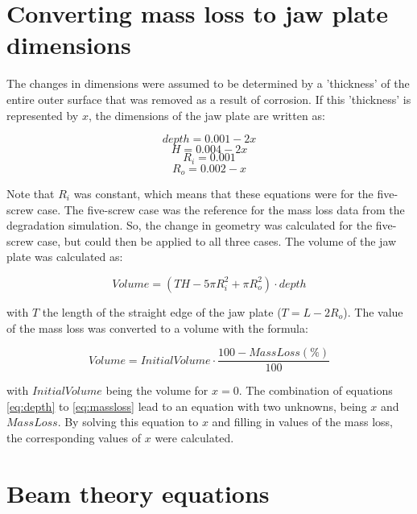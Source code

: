 \begin{subappendices}

\section{Converting mass loss to jaw plate dimensions}
\label{sec:jawplatedimensions}

The changes in dimensions were assumed to be determined by a 'thickness' of the entire outer surface that was removed as a result of corrosion. If this 'thickness' is represented by $x$, the dimensions of the jaw plate are written as:

\begin{equation}
depth=0.001-2x
\label{eq:depth}
\end{equation}
\begin{equation}
H=0.004-2x
\end{equation}
\begin{equation}
R_i=0.001
\end{equation}
\begin{equation}
R_o=0.002-x
\end{equation}

\noindent Note that $R_i$ was constant, which means that these equations were for the five-screw case. The five-screw case was the reference for the mass loss data from the degradation simulation. So, the change in geometry was calculated for the five-screw case, but could then be applied to all three cases. The volume of the jaw plate was calculated as:

\begin{equation}
Volume=(TH-5\pi R_i^2+\pi R_o^2)\cdot depth
\end{equation}

\noindent with $T$ the length of the straight edge of the jaw plate ($T=L-2R_o$). The value of the mass loss was converted to a volume with the formula:

\begin{equation}
Volume=InitialVolume\cdot  \frac{100-MassLoss(\%)}{100}
\label{eq:massloss}
\end{equation}

\noindent with $InitialVolume$ being the volume for $x=0$. The combination of equations \ref{eq:depth} to \ref{eq:massloss} lead to an equation with two unknowns, being $x$ and $MassLoss$. By solving this equation to $x$ and filling in values of the mass loss, the corresponding values of $x$ were calculated.

\section{Beam theory equations}
\label{sec:beamtheory}


\end{subappendices}
